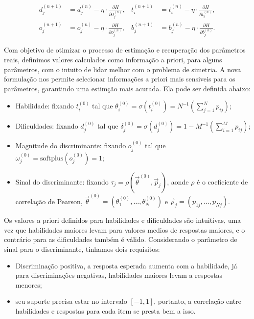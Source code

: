 \begin{align}
\label{eq:gd1}
    d_j^{(n+1)} &= d_j^{(n)} - \eta \cdot \frac{\partial H}{\partial d_j^{(n)}}, &
        t_i^{(n+1)} &= t_i^{(n)} - \eta \cdot \frac{\partial H}{\partial t_i^{(n)}},\\ \label{eq:gd2}
    o_j^{(n+1)} &= o_j^{(n)} - \eta \cdot \frac{\partial H}{\partial o_j^{(n)}}, &
    b_j^{(n+1)} &= b_j^{(n)} - \eta \cdot \frac{\partial H}{\partial b_j^{(n)}}.
\end{align}

Com objetivo de otimizar o processo de estimação e recuperação dos parâmetros reais, definimos valores calculados como informação a priori, para alguns parâmetros, com o intuito de lidar melhor com o problema de simetria. A nova formulação nos permite selecionar informações a priori mais sensiveis para os parâmetros, garantindo uma estimção mais acurada. Ela pode ser definida abaixo:

\begin{itemize}
    \item Habilidade: fixando $t_i^{(0)}$ tal que $\theta_i^{(0)} = \sigma(t_i^{(0)}) = N^{-1}\left(\sum_{j=1}^N p_{ij}\right)$;
    
    \item Dificuldades: fixando $d_j^{(0)}$ tal que $\delta_j^{(0)} = \sigma(d_j^{(0)}) = 1 - M^{-1}\left(\sum_{i=1}^M p_{ij}\right)$;
    \item Magnitude do discriminante: fixando $o_j^{(0)}$ tal que $\omega_j^{(0)} = \text{softplus}(o_j^{(0)}) = 1$;
    \item Sinal do discriminante: fixando $\tau_j = \rho(\vec{\theta}^{(0)}, \vec{p}_j)$, aonde $\rho$ é o coeficiente de correlação de Pearson, $\vec{\theta}^{(0)} = (\theta_1^{(0)},\ldots, \theta_N^{(0)})$ e $\vec{p}_j = (p_{1j},\ldots, p_{Nj})$.
\end{itemize}

Os valores a priori definidos para habilidades e dificuldades são intuitivas, uma vez que habilidades maiores levam para valores medios de respostas maiores, e o contrário para as dificuldades também é válido. 
Considerando o parâmetro de sinal para o discriminante, tínhamos dois requisitos:

\begin{itemize}
    \item[i] Discriminação positiva, a resposta esperada aumenta com a habilidade, já para discriminações negativas, habilidades maiores levam a respostas menores;
    
    \item[ii] seu suporte precisa estar no intervalo $[-1, 1]$, portanto, a correlação entre habilidades e respostas para cada item se presta bem a isso.
\end{itemize}

